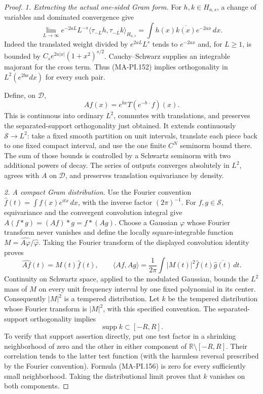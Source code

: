 \begin{proof}
\emph{1. Extracting the actual one-sided Gram form.}
For $h,k\in H_{a,s}$, a change of variables and dominated
convergence give
\[
 \lim_{L\to\infty}e^{-2aL}L^{-s}
       \langle\tau_{-L}h,\tau_{-L}k\rangle_{H_{a,s}}
       =\int h(x)\overline{k(x)}e^{-2ax}\,dx.
 \tag{MA-PI.154}
\]
Indeed the translated weight divided by $e^{2aL}L^s$
tends to $e^{-2ax}$ and, for $L\ge1$, is bounded by
$C_s e^{2a|x|}(1+x^2)^{s/2}$.  Cauchy--Schwarz supplies
an integrable majorant for the cross term.  Thus (MA-PI.152)
implies orthogonality in $L^2(e^{2bx}dx)$ for every such pair.

Define, on $\mathcal D$,
\[
 Af(x)=e^{bx}T(e^{-b\,\cdot}f)(x).
 \tag{MA-PI.155}
\]
This is continuous into ordinary $L^2$, commutes with
translations, and preserves the separated-support
orthogonality just obtained.  It extends continuously
$\mathcal S\to L^2$: take a fixed smooth partition on
unit intervals, translate each piece back to one fixed
compact interval, and use the one finite $C^N$ seminorm
bound there.  The sum of those bounds is controlled by
a Schwartz seminorm with two additional powers of decay.
The series of outputs converges absolutely in $L^2$,
agrees with $A$ on $\mathcal D$, and preserves translation
equivariance by density.

\emph{2. A compact Gram distribution.}
Use the Fourier convention
$\widehat f(t)=\int f(x)e^{itx}\,dx$, with the inverse
factor $(2\pi)^{-1}$.
For $f,g\in\mathcal S$, equivariance and the convergent
convolution integral give
$A(f*g)=(Af)*g=f*(Ag)$.
Choose a Gaussian $\varphi$ whose Fourier transform never
vanishes and define the locally square-integrable function
$M=\widehat{A\varphi}/\widehat\varphi$.
Taking the Fourier transform of the displayed convolution
identity proves
\[
 \widehat{Af}(t)=M(t)\widehat f(t),\qquad
 \langle Af,Ag\rangle
       =\frac{1}{2\pi}\int |M(t)|^2
                   \widehat f(t)\overline{\widehat g(t)}\,dt.
 \tag{MA-PI.156}
\]
Continuity on Schwartz space, applied to the modulated
Gaussian, bounds the $L^2$ mass of $M$ on every unit
frequency interval by one fixed polynomial in its center.
Consequently $|M|^2$ is a tempered distribution.
Let $k$ be the tempered distribution whose Fourier
transform is $|M|^2$, with this specified convention.
The separated-support orthogonality implies
\[
                       \operatorname{supp}k\subset[-R,R].
 \tag{MA-PI.157}
\]
To verify that support assertion directly, put one test
factor in a shrinking neighborhood of zero and the other
in either component of $\mathbb R\setminus[-R,R]$.
Their correlation tends to the latter test function (with
the harmless reversal prescribed by the Fourier convention).
Formula (MA-PI.156) is zero for every sufficiently small
neighborhood.  Taking the distributional limit proves
that $k$ vanishes on both components.


\end{proof}
